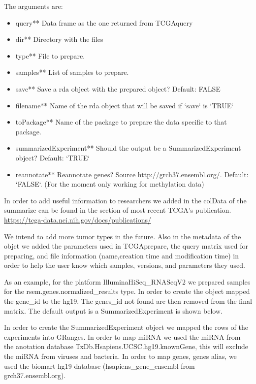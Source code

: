 The arguments are:
\begin{tiny}
\begin{itemize}[nolistsep]
\item query**	Data frame as the one returned from TCGAquery
\item dir**	Directory with the files
\item type**	File to prepare.
\item samples**	List of samples to prepare.
\item save**	Save a rda object with the prepared object? Default: FALSE
\item filename** Name of the rda object that will be saved if `save` is `TRUE`
\item toPackage** Name of the package to prepare the data specific to that package. 
\item summarizedExperiment** Should the output be a SummarizedExperiment object? Default: `TRUE`
\item reannotate** Reannotate genes? Source http://grch37.ensembl.org/. 
Default: `FALSE`. (For the moment only working for methylation data)
\end{itemize}
\end{tiny}

In order to add useful information to researchers we added in the colData of the 
summarize can be found in the section of most recent TCGA's publication.
\url{https://tcga-data.nci.nih.gov/docs/publications/}

We intend to add more tumor types in the future.
Also in the  metadata of the objet we added the parameters used in TCGAprepare,
the query matrix used for preparing, and file information (name,creation time and modification time) in order to help the user know which samples, versions, and parameters they used.

As an example, for the platform IlluminaHiSeq\_RNASeqV2 we prepared  samples for the rsem.genes.normalized\_results type. In order to create the object mapped the gene\_id 
to the hg19. The genes\_id not found are then removed from the final matrix.
The default output is a SummarizedExperiment is shown below. 

In order to create the SummarizedExperiment object we mapped the rows of the 
experiments into GRanges. In order to map miRNA we used the miRNA from the anotation database TxDb.Hsapiens.UCSC.hg19.knownGene, this will exclude the miRNA from viruses and bacteria. 
In order to map genes, genes alias, we used the biomart hg19 database 
(hsapiens\_gene\_ensembl from grch37.ensembl.org).

